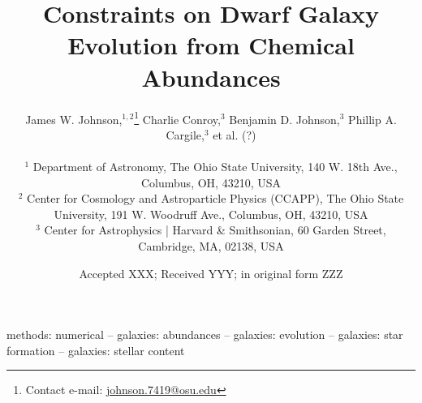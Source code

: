 \documentclass[fleqn, usenatbib]{mnras}
\title[Dwarf Galaxies and Chemical Abundances]{Constraints on Dwarf Galaxy
Evolution from Chemical Abundances}
\author[J.W. Johnson et al.]{James W. Johnson,$^{1, 2}$\thanks{
	Contact e-mail: \href{mailto:
	johnson.7419@osu.edu}{johnson.7419@osu.edu}}
	Charlie Conroy,$^{3}$
	Benjamin D. Johnson,$^{3}$
	Phillip A. Cargile,$^{3}$ et al. (?)
	\\ \null \\
	$^{1}$ Department of Astronomy, The Ohio State University,
	140 W. 18th Ave., Columbus, OH, 43210, USA
	\\
	$^{2}$ Center for Cosmology and Astroparticle Physics (CCAPP),
	The Ohio State University, 191 W. Woodruff Ave., Columbus, OH, 43210, USA
	\\
	$^{3}$ Center for Astrophysics | Harvard \& Smithsonian, 60 Garden Street,
	Cambridge, MA, 02138, USA
}
\date{Accepted XXX; Received YYY; in original form ZZZ}
\begin{document}
\label{firstpage}
\pagerange{\pageref{firstpage}--\pageref{lastpage}}
\maketitle

\begin{keywords}
methods: numerical -- galaxies: abundances -- galaxies: evolution --
galaxies: star formation -- galaxies: stellar content
\end{keywords}







\label{lastpage}
\end{document}
